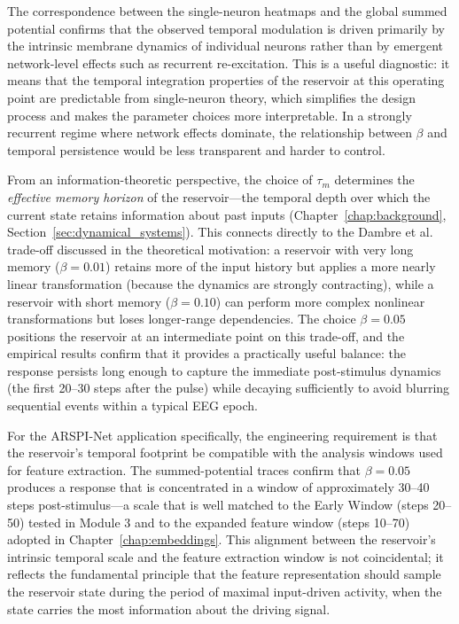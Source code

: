The correspondence between the single-neuron heatmaps and the global summed potential confirms that the observed temporal modulation is driven primarily by the intrinsic membrane dynamics of individual neurons rather than by emergent network-level effects such as recurrent re-excitation. This is a useful diagnostic: it means that the temporal integration properties of the reservoir at this operating point are predictable from single-neuron theory, which simplifies the design process and makes the parameter choices more interpretable. In a strongly recurrent regime where network effects dominate, the relationship between $\beta$ and temporal persistence would be less transparent and harder to control.

From an information-theoretic perspective, the choice of $\tau_m$ determines the \emph{effective memory horizon} of the reservoir---the temporal depth over which the current state retains information about past inputs (Chapter~\ref{chap:background}, Section~\ref{sec:dynamical_systems}). This connects directly to the Dambre et al.\ \cite{dambre_2012} trade-off discussed in the theoretical motivation: a reservoir with very long memory ($\beta = 0.01$) retains more of the input history but applies a more nearly linear transformation (because the dynamics are strongly contracting), while a reservoir with short memory ($\beta = 0.10$) can perform more complex nonlinear transformations but loses longer-range dependencies. The choice $\beta = 0.05$ positions the reservoir at an intermediate point on this trade-off, and the empirical results confirm that it provides a practically useful balance: the response persists long enough to capture the immediate post-stimulus dynamics (the first 20--30 steps after the pulse) while decaying sufficiently to avoid blurring sequential events within a typical EEG epoch.

For the ARSPI-Net application specifically, the engineering requirement is that the reservoir's temporal footprint be compatible with the analysis windows used for feature extraction. The summed-potential traces confirm that $\beta = 0.05$ produces a response that is concentrated in a window of approximately 30--40 steps post-stimulus---a scale that is well matched to the Early Window (steps 20--50) tested in Module 3 and to the expanded feature window (steps 10--70) adopted in Chapter~\ref{chap:embeddings}. This alignment between the reservoir's intrinsic temporal scale and the feature extraction window is not coincidental; it reflects the fundamental principle that the feature representation should sample the reservoir state during the period of maximal input-driven activity, when the state carries the most information about the driving signal.


